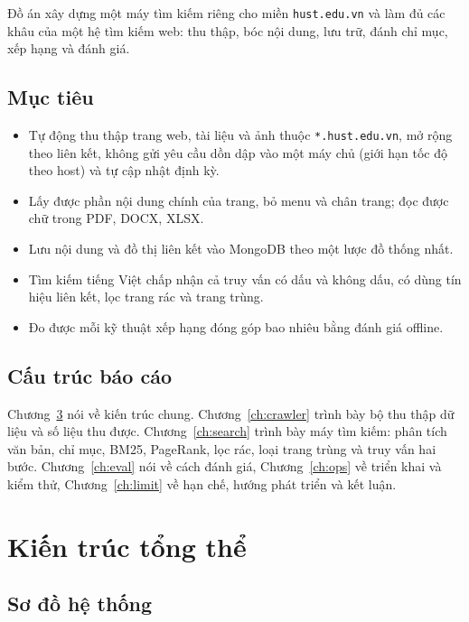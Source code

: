 \documentclass[12pt,a4paper]{report}
\begin{document}
Đồ án xây dựng một máy tìm kiếm riêng cho miền \texttt{hust.edu.vn} và làm đủ các khâu của một hệ tìm kiếm web: thu
thập, bóc nội dung, lưu trữ, đánh chỉ mục, xếp hạng và đánh giá.

\section{Mục tiêu}

\begin{itemize}
  \item Tự động thu thập trang web, tài liệu và ảnh thuộc \texttt{*.hust.edu.vn}, mở rộng theo liên kết, không gửi
        yêu cầu dồn dập vào một máy chủ (giới hạn tốc độ theo host) và tự cập nhật định kỳ.
  \item Lấy được phần nội dung chính của trang, bỏ menu và chân trang; đọc được chữ trong PDF, DOCX, XLSX.
  \item Lưu nội dung và đồ thị liên kết vào MongoDB theo một lược đồ thống nhất.
  \item Tìm kiếm tiếng Việt chấp nhận cả truy vấn có dấu và không dấu, có dùng tín hiệu liên kết, lọc trang rác và
        trang trùng.
  \item Đo được mỗi kỹ thuật xếp hạng đóng góp bao nhiêu bằng đánh giá offline.
\end{itemize}

\section{Cấu trúc báo cáo}

Chương~\ref{ch:arch} nói về kiến trúc chung. Chương~\ref{ch:crawler} trình bày bộ thu thập dữ liệu và số liệu thu
được. Chương~\ref{ch:search} trình bày máy tìm kiếm: phân tích văn bản, chỉ mục, BM25, PageRank, lọc rác, loại trang
trùng và truy vấn hai bước. Chương~\ref{ch:eval} nói về cách đánh giá, Chương~\ref{ch:ops} về triển khai và kiểm thử,
Chương~\ref{ch:limit} về hạn chế, hướng phát triển và kết luận.

\chapter{Kiến trúc tổng thể}\label{ch:arch}

\section{Sơ đồ hệ thống}
\end{document}
